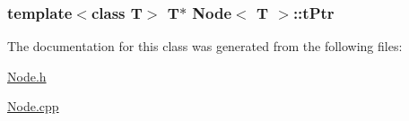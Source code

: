 \subsubsection[{\texorpdfstring{t\+Ptr}{tPtr}}]{\setlength{\rightskip}{0pt plus 5cm}template$<$class T$>$ T$\ast$ {\bf Node}$<$ T $>$\+::t\+Ptr\hspace{0.3cm}{\ttfamily [private]}}\hypertarget{classNode_ae6ced078eb7da64ab447676be5f22024}{}\label{classNode_ae6ced078eb7da64ab447676be5f22024}


The documentation for this class was generated from the following files\+:\begin{DoxyCompactItemize}
\item 
\hyperlink{Node_8h}{Node.\+h}\item 
\hyperlink{Node_8cpp}{Node.\+cpp}\end{DoxyCompactItemize}
